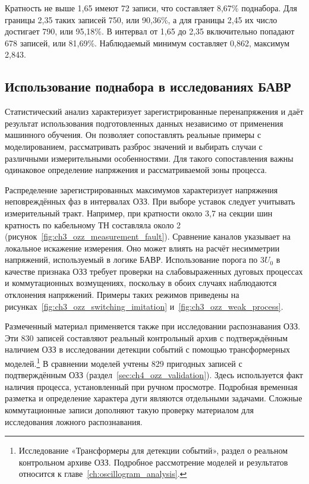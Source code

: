 Кратность не выше 1,65 имеют 72 записи, что составляет 8,67\%
поднабора. Для границы 2,35 таких записей 750, или 90,36\%,
а для границы 2,45 их число достигает 790, или 95,18\%.
В интервал от 1,65 до 2,35 включительно попадают 678 записей,
или 81,69\%. Наблюдаемый минимум составляет 0,862,
максимум 2,843.

\subsection{Использование поднабора в исследованиях БАВР}


Статистический анализ характеризует зарегистрированные
перенапряжения и даёт результат использования подготовленных
данных независимо от применения машинного обучения.
Он позволяет сопоставлять реальные примеры с моделированием,
рассматривать разброс значений и выбирать случаи с различными
измерительными особенностями. Для такого сопоставления важны
одинаковое определение напряжения и рассматриваемой зоны процесса.

Распределение зарегистрированных максимумов характеризует напряжения неповреждённых фаз
в интервалах ОЗЗ. При выборе уставок следует учитывать измерительный тракт. Например,
при кратности около 3,7 на секции шин кратность по кабельному ТН составляла около 2
(рисунок~\ref{fig:ch3_ozz_measurement_fault}). Сравнение каналов указывает на локальное
искажение измерения. Оно может влиять на расчёт несимметрии напряжений, используемый в
логике БАВР. Использование порога по $3U_0$ в качестве признака ОЗЗ требует проверки на
слабовыраженных дуговых процессах и коммутационных возмущениях, поскольку в обоих
случаях наблюдаются отклонения напряжений. Примеры таких режимов приведены на
рисунках~\ref{fig:ch3_ozz_switching_imitation} и~\ref{fig:ch3_ozz_weak_process}.

Размеченный материал применяется также при исследовании
распознавания ОЗЗ. Эти 830 записей составляют реальный контрольный
архив с подтверждённым наличием ОЗЗ в исследовании детекции
событий с помощью трансформерных моделей.\footnote{Исследование
«Трансформеры для детекции событий», раздел о реальном контрольном
архиве ОЗЗ. Подробное рассмотрение моделей и результатов относится
к главе~\ref{ch:oscillogram_analysis}.} В сравнении моделей учтены 829 пригодных записей
с подтверждённым ОЗЗ (раздел~\ref{sec:ch4_ozz_validation}).
Здесь используется факт наличия процесса, установленный при
ручном просмотре. Подробная временная разметка и определение
характера дуги являются отдельными задачами. Сложные коммутационные
записи дополняют такую проверку материалом для исследования
ложного распознавания.

